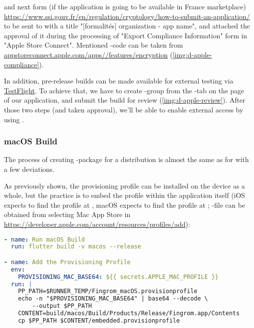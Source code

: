\noindent and next form (if the application is going to be available in France marketplace) 
\href{https://www.ssi.gouv.fr/en/regulation/cryptology/how-to-submit-an-application/}{https://www.ssi.gouv.fr/en/regulation/cryptology/how-to-submit-an-application/}
to be sent to  with a title "[formalités] {organization} - {app name}", and attached the approval 
of it during the processing of "Export Compliance Information" form in "Apple Store Connect". Mentioned 
-code can be taken from 
\href{https://appstoreconnect.apple.com/apps}{appstoreconnect.apple.com/apps//features/encryption}
(\cref{img:d-apple-compliance}).


In addition, pre-release builds can be made available for external testing via 
\href{https://testflight.apple.com/a}{TestFlight}. To achieve that, we have to create -group from 
the -tab on the page of our application, and submit the build for review (\cref{img:d-apple-review}).
After those two steps (and taken approval), we'll be able to enable external access by using .



\subsubsection{macOS Build}

The process of creating -package for a distribution  is almost the same as for  with a few 
deviations.

As previously shown, the provisioning profile can be installed on the device as a whole, but the practice is to embed 
the profile within the application itself (iOS expects to find the profile at , 
macOS expects to find the profile at ; -file can 
be obtained from selecting Mac App Store in 
\href{https://developer.apple.com/account/resources/profiles/add}{https://developer.apple.com/account/resources/profiles/add}):

\begin{lstlisting}[language=yaml]
- name: Run macOS Build
  run: flutter build -v macos --release

- name: Add the Provisioning Profile
  env:
    PROVISIONING_MAC_BASE64: ${{ secrets.APPLE_MAC_PROFILE }}
  run: |
    PP_PATH=$RUNNER_TEMP/Fingrom_macOS.provisionprofile
    echo -n "$PROVISIONING_MAC_BASE64" | base64 --decode \
        --output $PP_PATH
    CONTENT=build/macos/Build/Products/Release/Fingrom.app/Contents
    cp $PP_PATH $CONTENT/embedded.provisionprofile
\end{lstlisting}


